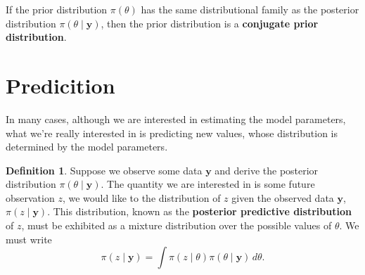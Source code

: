 \documentclass[
]{book}
\theoremstyle{definition}
\newtheorem{definition}{Definition}[chapter]
\theoremstyle{definition}
\theoremstyle{definition}
\theoremstyle{definition}
\theoremstyle{remark}
\begin{document}
If the prior distribution \(\pi(\theta)\) has the same distributional family as the posterior distribution \(\pi(\theta \mid \boldsymbol{y})\), then the prior distribution is a \textbf{conjugate prior distribution}.

\hypertarget{predicition}{%
\section{Predicition}\label{predicition}}

In many cases, although we are interested in estimating the model parameters, what we're really interested in is predicting new values, whose distribution is determined by the model parameters.

\begin{definition}
Suppose we observe some data \(\boldsymbol{y}\) and derive the posterior distribution \(\pi(\theta \mid \boldsymbol{y})\). The quantity we are interested in is some future observation \(z\), we would like to the distribution of \(z\) given the observed data \(\boldsymbol{y}\), \(\pi(z \mid \boldsymbol{y})\). This distribution, known as the \textbf{posterior predictive distribution} of \(z\), must be exhibited as a mixture distribution over the possible values of \(\theta\). We must write
\[
\pi(z \mid \boldsymbol{y}) = \int \pi(z \mid \theta) \pi(\theta \mid \boldsymbol{y})\, d\theta.
\]
\end{definition}
\end{document}
